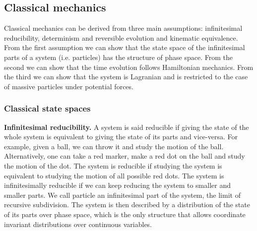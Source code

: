 \documentclass[twocolumn]{article}
\newif\ifextended
\newcommand\fact[2]{\ifextended \emph{#1}. #2 \fi}
\begin{document}
\subsection{Classical mechanics}

Classical mechanics can be derived from three main assumptions: infinitesimal reducibility, determinism and reversible evolution and kinematic equivalence. From the first assumption we can show that the state space of the infinitesimal parts of a system (i.e. particles) has the structure of phase space. From the second we can show that the time evolution follows Hamiltonian mechanics. From the third we can show that the system is Lagranian and is restricted to the case of massive particles under potential forces.

\subsubsection{Classical state spaces}

\textbf{Infinitesimal reducibility.} A system is said reducible if giving the state of the whole system is equivalent to giving the state of its parts and vice-versa. For example, given a ball, we can throw it and study the motion of the ball. Alternatively, one can take a red marker, make a red dot on the ball and study the motion of the dot. The system is reducible if studying the system is equivalent to studying the motion of all possible red dots. The system is infinitesimally reducible if we can keep reducing the system to smaller and smaller parts. We call particle an infinitesimal part of the system, the limit of recursive subdivision. The system is then described by a distribution of the state of its parts over phase space, which is the only structure that allows coordinate invariant distributions over continuous variables.

\fact{Composite states are distributions over particle states} {Under infinitesimal reducibility, if $\mathcal{C}$ is the state space of the while system and $\mathcal{S}$ is the state space of the particles, then each state $c \in \mathcal{C}$ for the full system is identified by a distribution $\rho : \mathcal{S} \to \mathbb{R}$ over the states of infinitesimal parts. The function is real to signify that we can associate arbitrarily small amounts to each particle states. The distribution tells us how many particles can be found in each particle state.}

\fact{Continuous time implies particle state space is a manifold} {If time is assumed to be continuous, then the state space $\mathcal{S}$ is a manifold. That is, each particle state $s \in U \subseteq \mathcal{S}$ can be identified by a set of continuous quantities $\xi^a : U \to \mathbb{R}$ which we call state variables. It is a consequence of the general theory that, if we wanted to write a trajectory $\xi^a(t)$, then this must be a topologically continuous function. Therefore, conceptually, once we assume time to be a real number, the state space of the particles must be charted by a set of real quantities: the topology that is given to time reasserts itself on all the quantities that will depend on time.}
\end{document}

